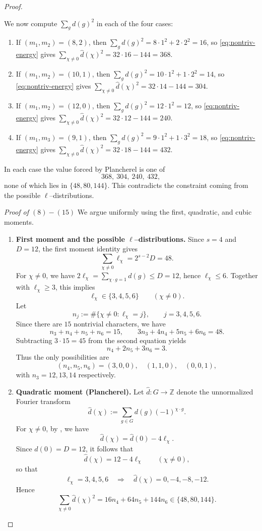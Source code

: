 \documentclass[12pt,twoside,]{amsart}
\theoremstyle{plain}
\theoremstyle{definition}
\begin{document}
\begin{proof}
\begin{enumerate}
We now compute $\sum_g d(g)^2$ in each of the four cases:
\begin{enumerate}
\item If $(m_1,m_2)=(8,2)$, then $\sum_g d(g)^2 = 8\cdot 1^2 + 2\cdot 2^2=16$,
so \eqref{eq:nontriv-energy} gives $\sum_{\chi\neq 0}\widehat d(\chi)^2=32\cdot16-144=368$.
\item If $(m_1,m_2)=(10,1)$, then $\sum_g d(g)^2 = 10\cdot 1^2 + 1\cdot 2^2=14$,
so \eqref{eq:nontriv-energy} gives $\sum_{\chi\neq 0}\widehat d(\chi)^2=32\cdot14-144=304$.
\item If $(m_1,m_2)=(12,0)$, then $\sum_g d(g)^2 = 12\cdot 1^2 = 12$,
so \eqref{eq:nontriv-energy} gives $\sum_{\chi\neq 0}\widehat d(\chi)^2=32\cdot12-144=240$.
\item If $(m_1,m_3)=(9,1)$, then $\sum_g d(g)^2 = 9\cdot 1^2 + 1\cdot 3^2=18$,
so \eqref{eq:nontriv-energy} gives $\sum_{\chi\neq 0}\widehat d(\chi)^2=32\cdot18-144=432$.
\end{enumerate}
In each case the value forced by Plancherel is one of
\[
368,\ 304,\ 240,\ 432,
\]
none of which lies in $\{48,80,144\}$. This contradicts the constraint coming from
the possible $\ell$--distributions.
\end{enumerate}


\noindent\textit{Proof of $(8)-(15)$}
We argue uniformly using the first, quadratic, and cubic moments.

\begin{enumerate}
\item[(i)] \textbf{First moment and the possible $\ell$--distributions.}
Since $s=4$ and $D=12$, the first moment identity gives
\[
\sum_{\chi\neq 0}\ell_\chi = 2^{s-2}D = 48.
\]
For $\chi\neq 0$, we have $2\ell_\chi=\sum_{\chi\cdot g=1} d(g)\le D=12$, hence
$\ell_\chi\le 6$. Together with $\ell_\chi\ge 3$, this implies
\[
\ell_\chi\in\{3,4,5,6\}\qquad(\chi\neq 0).
\]
Let
\[
n_j:=\#\{\chi\neq 0:\ell_\chi=j\},\qquad j=3,4,5,6.
\]
Since there are $15$ nontrivial characters, we have
\[
n_3+n_4+n_5+n_6=15,
\qquad
3n_3+4n_4+5n_5+6n_6=48.
\]
Subtracting $3\cdot 15=45$ from the second equation yields
\[
n_4+2n_5+3n_6=3.
\]
Thus the only possibilities are
\[
(n_4,n_5,n_6)=(3,0,0),\quad (1,1,0),\quad (0,0,1),
\]
with $n_3=12,13,14$ respectively.

\item[(ii)] \textbf{Quadratic moment (Plancherel).}
Let $\widehat d:G\to\mathbb Z$ denote the unnormalized Fourier transform
\[
\widehat d(\chi):=\sum_{g\in G} d(g)(-1)^{\chi\cdot g}.
\]
For $\chi\neq 0$, by , we have 
\[
\widehat d(\chi)=\widehat d(0)-4\ell_\chi.
\]
Since $\widehat d(0)=D=12$, it follows that
\[
\widehat d(\chi)=12-4\ell_\chi\qquad(\chi\neq 0),
\]
so that
\[
\ell_\chi=3,4,5,6
\quad\Longrightarrow\quad
\widehat d(\chi)=0,-4,-8,-12.
\]
Hence
\[
\sum_{\chi\neq 0}\widehat d(\chi)^2
=
16n_4+64n_5+144n_6
\in\{48,80,144\}.
\]


\end{enumerate}
\end{proof}
\end{document}
